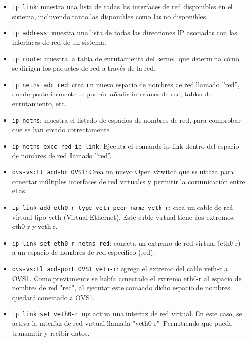 \documentclass[a4paper, 12pt]{book}
\begin{document}
	\begin{itemize}
		\item \verb*|ip link|: muestra una lista de todas las interfaces de red disponibles en el sistema, incluyendo tanto las disponibles como las no disponibles.
		
		\item \verb*|ip address|: muestra una lista de todas las direcciones IP asociadas con las interfaces de red de un sistema.
		
		\item \verb*|ip route|: muestra la tabla de enrutamiento del kernel, que determina cómo se dirigen los paquetes de red a través de la red.
		
		\item \verb*|ip netns add red|: crea un nuevo espacio de nombres de red llamado ''red'', donde posteriormente se podrán añadir interfaces de red, tablas de enrutamiento, etc. 
		
		\item \verb*|ip netns|: muestra el listado de espacios de nombres de red, para comprobar que se han creado correctamente.
		
		\item \verb*|ip netns exec red ip link|: Ejecuta el comando ip link dentro del espacio de nombres de red llamado ''red''. 
			
		\item \verb*|ovs-vsctl add-br OVS1|: Crea un nuevo Open vSwitch que se utiliza para conectar múltiples interfaces de red virtuales y permitir la comunicación entre ellas. 
				
		\item \verb*|ip link add eth0-r type veth peer name veth-r|:  crea un cable de red virtual tipo veth (Virtual Ethernet). Este cable virtual tiene dos extremos: eth0-r y veth-r.
		
		\item \verb*|ip link set eth0-r netns red|: conecta un extremo de red virtual (eth0-r) a un espacio de nombres de red específico (red). 
		
		\item \verb*|ovs-vsctl add-port OVS1 veth-r|: agrega el extremo del cable veth-r a OVS1. Como previamente se había conectado el extremo eth0-r al espacio de nombres de red "red", al ejecutar este comando dicho espacio de nombres quedará conectado a OVS1.
		
		\item \verb*|ip link set veth0-r up|: activa una interfaz de red virtual. En este caso, se activa la interfaz de red virtual llamada "veth0-r". Permitiendo que pueda transmitir y recibir datos. 
		

\end{itemize}
\end{document}
